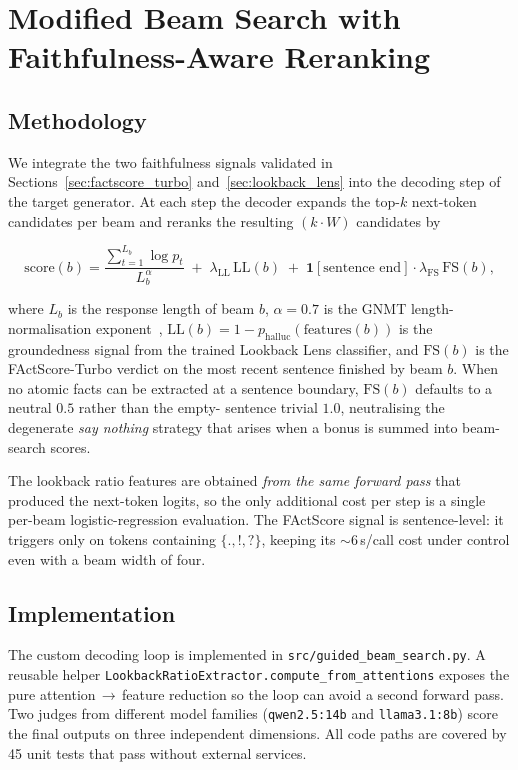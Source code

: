 \section{Modified Beam Search with Faithfulness-Aware Reranking}
\label{ch:beam_search}

\subsection{Methodology}

We integrate the two faithfulness signals validated in
Sections~\ref{sec:factscore_turbo} and~\ref{sec:lookback_lens} into the
decoding step of the target generator.  At each step the decoder expands the
top-$k$ next-token candidates per beam and reranks the resulting
$(k \cdot W)$ candidates by

\begin{equation}
\mathrm{score}(b) =
\frac{\sum_{t=1}^{L_b} \log p_t}{L_b^{\alpha}}
\;+\; \lambda_{\text{LL}}\, \mathrm{LL}(b)
\;+\; \mathbf{1}[\text{sentence end}] \cdot \lambda_{\text{FS}}\, \mathrm{FS}(b),
\label{eq:guided_score}
\end{equation}

where $L_b$ is the response length of beam $b$, $\alpha = 0.7$ is the GNMT
length-normalisation exponent~\cite{wu2016google},
$\mathrm{LL}(b) = 1 - p_{\text{halluc}}(\text{features}(b))$ is the
groundedness signal from the trained Lookback Lens classifier, and
$\mathrm{FS}(b)$ is the FActScore-Turbo verdict on the most recent sentence
finished by beam $b$.  When no atomic facts can be extracted at a sentence
boundary, $\mathrm{FS}(b)$ defaults to a neutral $0.5$ rather than the empty-
sentence trivial $1.0$, neutralising the degenerate \emph{say nothing}
strategy that arises when a bonus is summed into beam-search scores.

The lookback ratio features are obtained \emph{from the same forward pass}
that produced the next-token logits, so the only additional cost per step is
a single per-beam logistic-regression evaluation.  The FActScore signal is
sentence-level: it triggers only on tokens containing $\{., !, ?\}$, keeping
its $\sim$6\,s/call cost under control even with a beam width of four.

\subsection{Implementation}

The custom decoding loop is implemented in \texttt{src/guided\_beam\_search.py}.
A reusable helper \texttt{LookbackRatioExtractor.compute\_from\_attentions}
exposes the pure attention\,$\to$\,feature reduction so the loop can avoid a
second forward pass.  Two judges from different model families
(\texttt{qwen2.5:14b} and \texttt{llama3.1:8b}) score the final outputs on
three independent dimensions.  All code paths are covered by 45 unit tests
that pass without external services.

